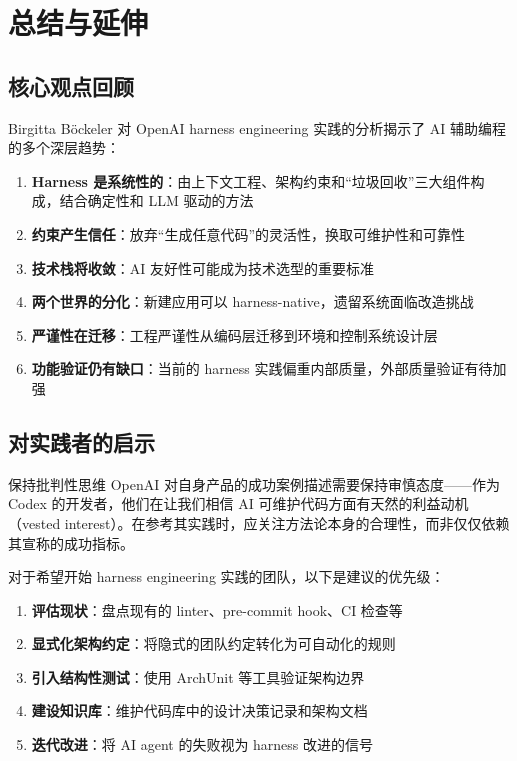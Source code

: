 \section{总结与延伸}

\subsection{核心观点回顾}

Birgitta B\"{o}ckeler 对 OpenAI harness engineering 实践的分析揭示了 AI 辅助编程的多个深层趋势：

\begin{enumerate}[leftmargin=1.5em]
    \item \textbf{Harness 是系统性的}：由上下文工程、架构约束和``垃圾回收''三大组件构成，结合确定性和 LLM 驱动的方法
    \item \textbf{约束产生信任}：放弃``生成任意代码''的灵活性，换取可维护性和可靠性
    \item \textbf{技术栈将收敛}：AI 友好性可能成为技术选型的重要标准
    \item \textbf{两个世界的分化}：新建应用可以 harness-native，遗留系统面临改造挑战
    \item \textbf{严谨性在迁移}：工程严谨性从编码层迁移到环境和控制系统设计层
    \item \textbf{功能验证仍有缺口}：当前的 harness 实践偏重内部质量，外部质量验证有待加强
\end{enumerate}

\subsection{对实践者的启示}

\begin{warningbox}{保持批判性思维}
OpenAI 对自身产品的成功案例描述需要保持审慎态度------作为 Codex 的开发者，他们在让我们相信 AI 可维护代码方面有天然的利益动机（vested interest）。在参考其实践时，应关注方法论本身的合理性，而非仅仅依赖其宣称的成功指标。
\end{warningbox}

对于希望开始 harness engineering 实践的团队，以下是建议的优先级：

\begin{enumerate}[leftmargin=1.5em]
    \item \textbf{评估现状}：盘点现有的 linter、pre-commit hook、CI 检查等
    \item \textbf{显式化架构约定}：将隐式的团队约定转化为可自动化的规则
    \item \textbf{引入结构性测试}：使用 ArchUnit 等工具验证架构边界
    \item \textbf{建设知识库}：维护代码库中的设计决策记录和架构文档
    \item \textbf{迭代改进}：将 AI agent 的失败视为 harness 改进的信号
\end{enumerate}

